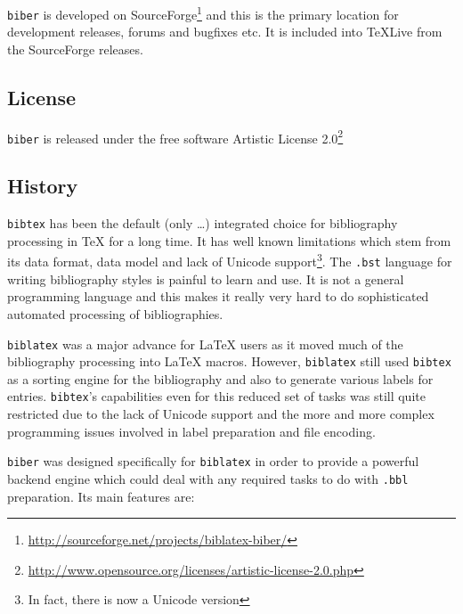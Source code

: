 \documentclass{ltxdockit}
\begin{document}
\verb+biber+ is developed on
SourceForge\footnote{\url{http://sourceforge.net/projects/biblatex-biber/}}
and this is the primary location for development releases, forums and
bugfixes etc. It is included into TeXLive from the SourceForge releases.

\subsection{License}

\verb+biber+ is released under the free software Artistic License 2.0\footnote{\url{http://www.opensource.org/licenses/artistic-license-2.0.php}}

\subsection{History}

\verb+bibtex+ has been the default (only \ldots) integrated choice for
bibliography processing in TeX for a long time. It has well known
limitations which stem from its data format, data model and lack of Unicode
support\footnote{In fact, there is now a Unicode version}. The
\verb+.bst+ language for writing bibliography styles is painful to learn
and use. It is not a general programming language and this makes it really
very hard to do sophisticated automated processing of bibliographies.

\verb+biblatex+ was a major advance for LaTeX users as it moved much
of the bibliography processing into LaTeX macros. However,
\verb+biblatex+ still used \verb+bibtex+ as a sorting engine for the
bibliography and also to generate various labels for
entries. \verb+bibtex+'s capabilities even for this reduced set of
tasks was still quite restricted due to the lack of Unicode support and
the more and more complex programming issues involved in label
preparation and file encoding.

\verb+biber+ was designed specifically for \verb+biblatex+ in order to
provide a powerful backend engine which could deal with any required
tasks to do with \verb+.bbl+ preparation. Its main features are:
\end{document}
